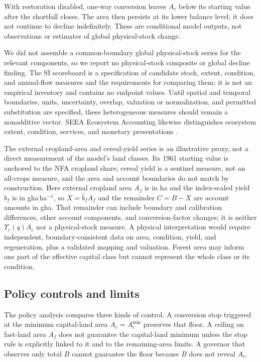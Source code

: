 \documentclass[preprint,12pt,authoryear]{elsarticle}
\newcommand{\Ups}{\Upsilon_c}
\newcommand{\Acmin}{A_c^{\min}}
\begin{document}
With restoration disabled, one-way conversion leaves $A_c$ below its starting value after the shortfall closes. The area then persists at its lower balance level; it does not continue to decline indefinitely. These are conditional model outputs, not observations or estimates of global physical-stock change.

We did not assemble a common-boundary global physical-stock series for the relevant components, so we report no physical-stock composite or global decline finding. The SI scoreboard is a specification of candidate stock, extent, condition, and annual-flow measures and the requirements for comparing them; it is not an empirical inventory and contains no endpoint values. Until spatial and temporal boundaries, units, uncertainty, overlap, valuation or normalization, and permitted substitution are specified, these heterogeneous measures should remain a nonadditive vector. SEEA Ecosystem Accounting likewise distinguishes ecosystem extent, condition, services, and monetary presentations \citep{UN2021SEEA_EA}.

The external cropland-area and cereal-yield series is an illustrative proxy, not a direct measurement of the model's land classes. Its 1961 starting value is anchored to the NFA cropland share; cereal yield is a sentinel measure, not an all-crops measure, and the area and account boundaries do not match by construction. Here external cropland area $A_f$ is in ha and the index-scaled yield $\hat b_f$ is in gha\,ha$^{-1}$, so $X=\hat b_fA_f$ and the remainder $C=B-X$ are account amounts in gha. That remainder can include boundary and calibration differences, other account components, and conversion-factor changes; it is neither $\Ups(q)A_c$ nor a physical-stock measure. A physical interpretation would require independent, boundary-consistent data on area, condition, yield, and regeneration, plus a validated mapping and valuation. Forest area may inform one part of the effective capital class but cannot represent the whole class or its condition.

\subsection{Policy controls and limits}

The policy analysis compares three kinds of control. A conversion stop triggered at the minimum capital-land area $A_c=\Acmin$ preserves that floor. A ceiling on fast-land area $A_f$ does not guarantee the capital-land minimum unless the stop rule is explicitly linked to it and to the remaining-area limits. A governor that observes only total $B$ cannot guarantee the floor because $B$ does not reveal $A_c$.
\end{document}
